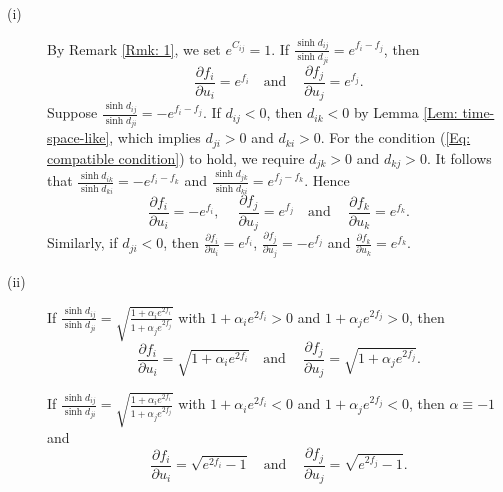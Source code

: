 \documentclass[12pt]{amsart}
\theoremstyle{definition}
\begin{document}
\begin{description}
\item[(i)]
By Remark \ref{Rmk: 1}, we set $e^{C_{ij}}=1$.
If $\frac{\sinh d_{ij}}{\sinh d_{ji}}=e^{f_i-f_j}$,
then
\begin{equation*}
\frac{\partial f_i}{\partial u_i}=e^{f_i}
\quad \text{and}\ \quad
\frac{\partial f_j}{\partial u_j}=e^{f_j}.
\end{equation*}
Suppose $\frac{\sinh d_{ij}}{\sinh d_{ji}}=-e^{f_i-f_j}$.
If $d_{ij}<0$, then $d_{ik}<0$ by Lemma \ref{Lem: time-space-like}, which implies $d_{ji}>0$ and $d_{ki}>0$.
For the condition (\ref{Eq: compatible condition}) to hold, we require $d_{jk}>0$ and $d_{kj}>0$.
It follows that $\frac{\sinh d_{ik}}{\sinh d_{ki}}=-e^{f_i-f_k}$ and $\frac{\sinh d_{jk}}{\sinh d_{ki}}=e^{f_j-f_k}$.
Hence
\begin{equation}\label{Eq: F26}
\frac{\partial f_i}{\partial u_i}=-e^{f_i},\ \quad
\frac{\partial f_j}{\partial u_j}=e^{f_j}
\quad \text{and}\ \quad
\frac{\partial f_k}{\partial u_k}=e^{f_k}.
\end{equation}
Similarly, if $d_{ji}<0$, then $\frac{\partial f_i}{\partial u_i}=e^{f_i}$, $\frac{\partial f_j}{\partial u_j}=-e^{f_j}$ and $\frac{\partial f_k}{\partial u_k}=e^{f_k}$.

\item[(ii)]
If $\frac{\sinh d_{ij}}{\sinh d_{ji}}
=\sqrt{\frac{1+\alpha_{i}e^{2f_i}}{1+\alpha_{j}e^{2f_j}}}$ with $1+\alpha_{i}e^{2f_i}>0$ and $1+\alpha_{j}e^{2f_j}> 0$,
then
\begin{equation*}
\frac{\partial f_i}{\partial u_i}=\sqrt{1+\alpha_ie^{2f_i}} \quad \text{and}\ \quad
\frac{\partial f_j}{\partial u_j}=\sqrt{1+\alpha_je^{2f_j}}.
\end{equation*}

If $\frac{\sinh d_{ij}}{\sinh d_{ji}}
=\sqrt{\frac{1+\alpha_{i}e^{2f_i}}{1+\alpha_{j}e^{2f_j}}}$ with $1+\alpha_{i}e^{2f_i}<0$ and $1+\alpha_{j}e^{2f_j}<0$,
then $\alpha\equiv -1$ and
\begin{equation*}
\frac{\partial f_i}{\partial u_i}=\sqrt{e^{2f_i}-1} \quad \text{and}\ \quad
\frac{\partial f_j}{\partial u_j}=\sqrt{e^{2f_j}-1}.
\end{equation*}


\end{description}
\end{document}
